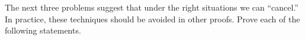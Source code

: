 %
%
\begin{exercisegroup}
\begin{para}The next three problems suggest that under the right situations we can ``cancel.''  In practice, these techniques should be avoided in other proofs.  Prove each of the following statements.\end{para}
%
\end{exercisegroup}
